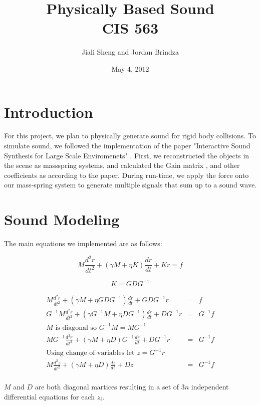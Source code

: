 \documentclass{article}
\begin{document}
\title{Physically Based Sound\\CIS 563}
\date{May 4, 2012}
\author{Jiali Sheng and Jordan Brindza}
\maketitle
  

\section{Introduction}
For this project, we plan to physically generate sound for rigid body
collisions. To simulate sound, we followed the implementation of the paper
"Interactive Sound Synthesis for Large Scale Enviromenets" \cite{Raghuvanshi}. First, we
reconstructed the objects in the scene as massspring systems, and calculated
the Gain matrix , and other coefficients as according to the paper. During
run-time, we apply the force onto our mass-spring system to generate multiple
signals that sum up to a sound wave. 

\section{Sound Modeling}
The main equations we implemented are as follows:

  $$
    M\frac{d^2 r}{dt^2} + (\gamma M + \eta K) \frac{dr}{dt} + Kr = f
  $$

  $$
    K = GDG^{-1}
  $$

  $$
    \begin{array}{ccc}
      M\frac{d^2 r}{dt^2} + (\gamma M + \eta GDG^{-1}) \frac{dr}{dt} + GDG^{-1}r & = & f \\[11pt]
      G^{-1} M\frac{d^2 r}{dt^2} + (\gamma G^{-1} M + \eta DG^{-1}) \frac{dr}{dt} + DG^{-1}r & = & G^{-1} f \\[11pt]
      \textrm{$M$ is diagonal so } G^{-1}M = MG^{-1} & & \\[11pt]
      M G^{-1} \frac{d^2 r}{dt^2} + (\gamma M + \eta D)G^{-1} \frac{dr}{dt} + DG^{-1}r & = & G^{-1} f \\[11pt]
      \textrm{Using change of variables let } z = G^{-1} r & & \\[11pt]
      M \frac{d^2 z}{dt^2} + (\gamma M + \eta D) \frac{dz}{dt} + Dz & = & G^{-1} f \\[11pt]
    \end{array}
  $$

  $M$ and $D$ are both diagonal martices resulting in a set of $3n$ independent differential equations for each $z_i$. 
\end{document}
